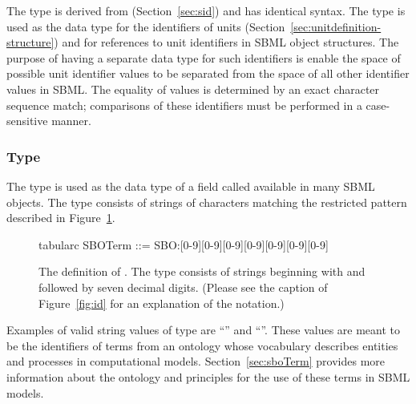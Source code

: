 The type  is derived from 
(Section~\ref{sec:sid}) and has identical syntax.  The
 type is used as the data type for the
identifiers of units (Section~\ref{sec:unitdefinition-structure})
and for references to unit identifiers in SBML object structures.
The purpose of having a separate data type for such identifiers is
enable the space of possible unit identifier values to be
separated from the space of all other identifier values in SBML.
The equality of  values is determined by an
exact character sequence match; \ie comparisons of these
identifiers must be performed in a case-sensitive manner.


\subsubsection{Type }
\label{sec:sboterm-type}

The type  is used as the data type of a field
called  available in many SBML objects.  The type
consists of strings of characters matching the restricted pattern
described in Figure~\ref{fig:sboterm}.

\begin{figure}[htb]
  \ttfamily
  \small
    \begin{center}
      \begin{edtable}{tabular}{c}
        SBOTerm ::= SBO:[0-9][0-9][0-9][0-9][0-9][0-9][0-9]
      \end{edtable}
    \end{center}
  \caption{The definition of .  The
     type consists of strings beginning with
     and followed by seven decimal digits.  (Please see
    the caption of Figure~\protect\ref{fig:id} for an explanation
    of the notation.)}
  \label{fig:sboterm}
\end{figure}

Examples of valid string values of type  are
``'' and ``''.  These values
are meant to be the identifiers of terms from an ontology whose
vocabulary describes entities and processes in computational
models.  Section~\ref{sec:sboTerm} provides more information about
the ontology and principles for the use of these terms in SBML
models.


